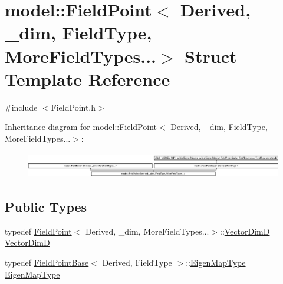 \hypertarget{structmodel_1_1_field_point_3_01_derived_00_01__dim_00_01_field_type_00_01_more_field_types_8_8_8_4}{}\section{model\+:\+:Field\+Point$<$ Derived, \+\_\+dim, Field\+Type, More\+Field\+Types...$>$ Struct Template Reference}
\label{structmodel_1_1_field_point_3_01_derived_00_01__dim_00_01_field_type_00_01_more_field_types_8_8_8_4}


{\ttfamily \#include $<$Field\+Point.\+h$>$}

Inheritance diagram for model\+:\+:Field\+Point$<$ Derived, \+\_\+dim, Field\+Type, More\+Field\+Types...$>$\+:\begin{figure}[H]
\begin{center}
\leavevmode
\includegraphics[height=1.153846cm]{structmodel_1_1_field_point_3_01_derived_00_01__dim_00_01_field_type_00_01_more_field_types_8_8_8_4}
\end{center}
\end{figure}
\subsection*{Public Types}
\begin{DoxyCompactItemize}
\item 
typedef \hyperlink{structmodel_1_1_field_point}{Field\+Point}$<$ Derived, \+\_\+dim, More\+Field\+Types...$>$\+::\hyperlink{structmodel_1_1_field_point_3_01_derived_00_01__dim_00_01_field_type_00_01_more_field_types_8_8_8_4_a2ef469cb0343605ab5118b31622e6bfe}{Vector\+Dim\+D} \hyperlink{structmodel_1_1_field_point_3_01_derived_00_01__dim_00_01_field_type_00_01_more_field_types_8_8_8_4_a2ef469cb0343605ab5118b31622e6bfe}{Vector\+Dim\+D}
\item 
typedef \hyperlink{structmodel_1_1_field_point_base}{Field\+Point\+Base}$<$ Derived, Field\+Type $>$\+::\hyperlink{structmodel_1_1_field_point_3_01_derived_00_01__dim_00_01_field_type_00_01_more_field_types_8_8_8_4_a102f7ec843b150f0f63e8bea197a193a}{Eigen\+Map\+Type} \hyperlink{structmodel_1_1_field_point_3_01_derived_00_01__dim_00_01_field_type_00_01_more_field_types_8_8_8_4_a102f7ec843b150f0f63e8bea197a193a}{Eigen\+Map\+Type}
\end{DoxyCompactItemize}
